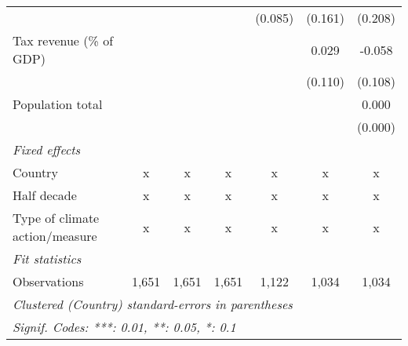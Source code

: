 \begin{tabular}{lcccccc}
                                                         &         &         &                & (0.085)        & (0.161)       & (0.208)\\   
   Tax revenue (\% of GDP)                               &         &         &                &                & 0.029         & -0.058\\   
                                                         &         &         &                &                & (0.110)       & (0.108)\\   
   Population total                                      &         &         &                &                &               & 0.000\\   
                                                         &         &         &                &                &               & (0.000)\\   
   \emph{Fixed effects}\\
   Country                                               & x       & x       & x              & x              & x             & x\\  
   Half decade                                           & x       & x       & x              & x              & x             & x\\  
   Type of climate action/measure                        & x       & x       & x              & x              & x             & x\\  
   \midrule \emph{Fit statistics}\\
   Observations                                          & 1,651   & 1,651   & 1,651          & 1,122          & 1,034         & 1,034\\  
   \midrule
   \multicolumn{7}{l}{\emph{Clustered (Country) standard-errors in parentheses}}\\
   \multicolumn{7}{l}{\emph{Signif. Codes: ***: 0.01, **: 0.05, *: 0.1}}\\
\end{tabular}
\par\endgroup


